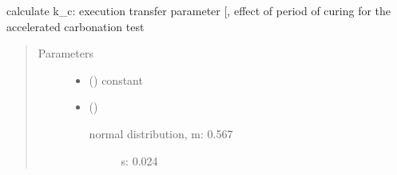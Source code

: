 \documentclass[letterpaper,10pt,english]{sphinxmanual}
\begin{document}

\begin{fulllineitems}
\label{\detokenize{carbonation:carbonation.k_c}}
\sphinxAtStartPar
calculate k\_c: execution transfer parameter {[}\sphinxhyphen{}{]}, effect of period of curing for the accelerated carbonation test
\begin{quote}\begin{description}
\item[{Parameters}] \leavevmode\begin{itemize}
\item {} 
\sphinxAtStartPar
{} (\sphinxstyleliteralemphasis{\sphinxupquote{ {[}}}\sphinxstyleliteralemphasis{\sphinxupquote{{]}}}) \textendash{} constant

\item {} 
\sphinxAtStartPar
{} (\sphinxstyleliteralemphasis{\sphinxupquote{ {[}}}\sphinxstyleliteralemphasis{\sphinxupquote{\sphinxhyphen{}}}\sphinxstyleliteralemphasis{\sphinxupquote{{]}}}) \textendash{} \begin{description}
\item[{normal distribution, m: \sphinxhyphen{}0.567}] \leavevmode
\sphinxAtStartPar
s: 0.024

\end{description}


\end{itemize}

\end{description}\end{quote}

\end{fulllineitems}

\end{document}
